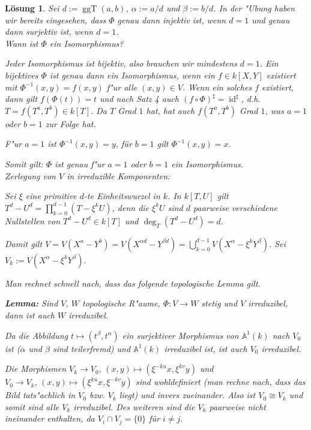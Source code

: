 \documentclass[a4paper, 12pt, numbers=noendperiod, chapterprefix=true]{scrbook}
\theoremstyle{break}
\newtheorem{Loes}{L\"osung}
\theoremstyle{nonumberbreak}
\theoremstyle{nonumberplain}
\newcommand{\isom}{\cong}
\DeclareMathOperator{\id}{id}
\DeclareMathOperator{\ggT}{ggT}
\newcommand{\A}{\mathbb{A}}
\newcommand{\Affine}{\mathbb{A}} %
\begin{document}
\setcounter{Loes}{2}

\begin{Loes}
Sei $d:= \ggT(a,b)$, $\alpha := a/d$ und $\beta := b/d$. In der "Ubung haben wir bereits eingesehen, dass $\Phi$ genau dann injektiv ist, wenn $d=1$ und genau dann surjektiv ist, wenn $d=1$.\\

\emph{Wann ist $\Phi$ ein Isomorphismus?}

Jeder Isomorphismus ist bijektiv, also brauchen wir mindestens $d=1$. Ein bijektives $\Phi$ ist genau dann ein Isomorphismus, wenn ein $f \in k[X,Y]$ existiert mit $\Phi^{-1}(x,y) = f(x,y)$ f"ur alle $(x,y) \in V$. Wenn ein solches $f$ existiert, dann gilt $f (\Phi(t)) = t$ und nach Satz 4 auch $(f \circ \Phi)^\sharp = \id^\sharp$, d.h. $T = f(T^a, T^b) \in k[T]$. Da $T$ Grad $1$ hat, hat auch $f(T^a , T^b)$ Grad $1$, was $a=1 $ oder $b=1$ zur Folge hat.

F"ur $a=1$ ist $\Phi^{-1}(x,y) =y$, für $b=1$ gilt $\Phi^{-1}(x,y) =x$.

Somit gilt: $\Phi$ ist genau f"ur $a=1$ oder $b=1$ ein Isomorphismus.\\

\emph{Zerlegung von $V$ in irreduzible Komponenten:}

Sei $\xi$ eine primitive $d$-te Einheitswurzel in $k$. In $k[T,U]$ gilt $T^d - U^d = \prod_{k=0}^{d-1} (T - \xi^k U)$, denn die $\xi^kU$ sind $d$ paarweise verschiedene Nullstellen von $T^d - U^d \in k[T]$ und $\deg_T(T^d - U^d) = d$.

Damit gilt $V = V(X^a - Y^b) = V(X^{\alpha d} - Y ^{\beta d}) = \bigcup_{k=0}^{d-1} V(X^\alpha - \xi^k Y^\beta)$. Sei $V_k := V(X^\alpha - \xi^k Y^\beta)$.

Man rechnet schnell nach, dass das folgende topologische Lemma gilt.

\textbf{Lemma:} Sind $V$, $W$ topologische R"aume, $\Phi \colon V \to W$ stetig und $V$ irreduzibel, dann ist auch $W$ irreduzibel.
 
Da die Abbildung $t \mapsto (t^\beta, t^\alpha)$ ein surjektiver Morphismus von $\Affine^1(k)$ nach $V_0$ ist ($\alpha$ und $\beta$ sind teilerfremd) und $\Affine^1(k)$ irreduzibel ist, ist auch $V_0$ irreduzibel.

Die Morphismen $V_k \to V_0, \, (x,y) \mapsto (\xi^{-ku} x, \xi^{kv} y)$ und $V_0 \to V_k, \, (x,y) \mapsto (\xi^{ku} x, \xi^{-kv} y)$ sind wohldefiniert (man rechne nach, dass das Bild tats"achlich in $V_0$ bzw. $V_k$ liegt) und invers zueinander. Also ist $V_0 \isom V_k$ und somit sind alle $V_k$ irreduzibel. Des weiteren sind die $V_k$ paarweise nicht ineinander enthalten, da $V_i \cap V_j = \{0\}$ für $i \neq j$.


\end{Loes}
\end{document}
